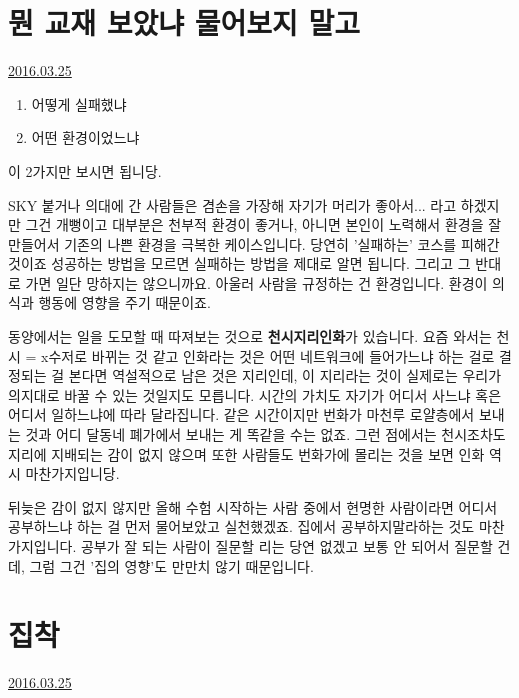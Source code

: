 \section{뭔 교재 보았냐 물어보지 말고}
\href{https://www.kockoc.com/Apoc/694072}{2016.03.25}

\vspace{5mm}
\begin{enumerate}
    \item 어떻게 실패했냐
    \item 어떤 환경이었느냐
\end{enumerate}
\vspace{5mm}

이 2가지만 보시면 됩니당.
\vspace{5mm}

SKY 붙거나 의대에 간 사람들은 겸손을 가장해 자기가 머리가 좋아서... 라고 하겠지만 그건 개뻥이고
대부분은 천부적 환경이 좋거나, 아니면 본인이 노력해서 환경을 잘 만들어서 기존의 나쁜 환경을 극복한 케이스입니다.
당연히 '실패하는' 코스를 피해간 것이죠
성공하는 방법을 모르면 실패하는 방법을 제대로 알면 됩니다. 그리고 그 반대로 가면 일단 망하지는 않으니까요.
아울러 사람을 규정하는 건 환경입니다. 환경이 의식과 행동에 영향을 주기 때문이죠.
\vspace{5mm}

동양에서는 일을 도모할 때 따져보는 것으로 \textbf{천시지리인화}가 있습니다.
요즘 와서는 천시 = x수저로 바뀌는 것 같고  인화라는 것은 어떤 네트워크에 들어가느냐 하는 걸로 결정되는 걸 본다면
역설적으로 남은 것은 지리인데, 이 지리라는 것이 실제로는 우리가 의지대로 바꿀 수 있는 것일지도 모릅니다.
시간의 가치도 자기가 어디서 사느냐 혹은 어디서 일하느냐에 따라 달라집니다.
같은 시간이지만 번화가 마천루 로얄층에서 보내는 것과 어디 달동네 폐가에서 보내는 게 똑같을 수는 없죠.
그런 점에서는 천시조차도 지리에 지배되는 감이 없지 않으며 또한 사람들도 번화가에 몰리는 것을 보면 인화 역시 마찬가지입니당.
\vspace{5mm}

뒤늦은 감이 없지 않지만 올해 수험 시작하는 사람 중에서 현명한 사람이라면 어디서 공부하느냐 하는 걸 먼저 물어보았고 실천했겠죠.
집에서 공부하지말라하는 것도 마찬가지입니다. 공부가 잘 되는 사람이 질문할 리는 당연 없겠고
보통 안 되어서 질문할 건데, 그럼 그건 '집의 영향'도 만만치 않기 때문입니다.
\vspace{5mm}






\section{집착}
\href{https://www.kockoc.com/Apoc/694074}{2016.03.25}

